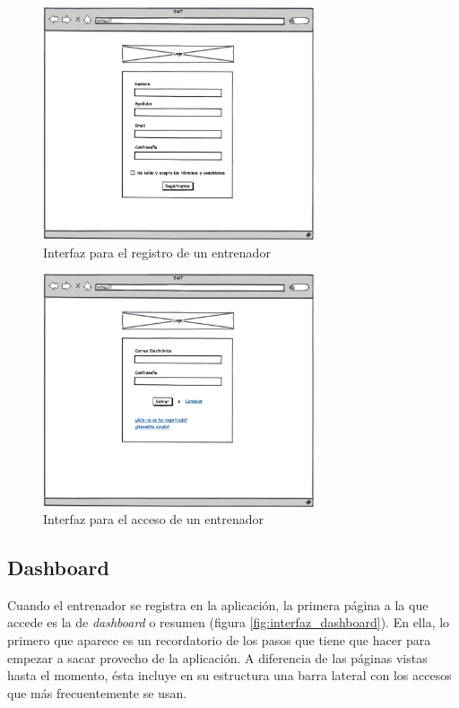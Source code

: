 		\begin{figure}[H]
		  \centering
		    \includegraphics[width=8cm]{./eps/p_interfaz/4_Registro.eps}
		  \caption{Interfaz para el registro de un entrenador}
		  \label{fig:interfaz_registro}
		\end{figure}
		
		\begin{figure}[H]
		  \centering
		    \includegraphics[width=8cm]{./eps/p_interfaz/5_Acceder.eps}
		  \caption{Interfaz para el acceso de un entrenador}
		  \label{fig:interfaz_acceso}
		\end{figure}
	
	\subsection{Dashboard} %
		\label{sub:interfaz_dashboard}
	
	Cuando el entrenador se registra en la aplicación, la primera página a la que accede es la de {\it dashboard} o resumen (figura \ref{fig:interfaz_dashboard}). En ella, lo primero que aparece es un recordatorio de los pasos que tiene que hacer para empezar a sacar provecho de la aplicación. A diferencia de las páginas vistas hasta el momento, ésta incluye en su estructura una barra lateral con los accesos que más frecuentemente se usan.
		

